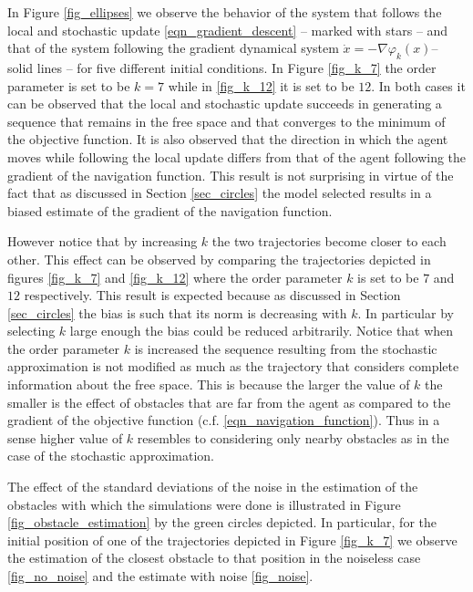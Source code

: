 \documentclass[article]{IEEEtran}
\theoremstyle{definition}
\begin{document}
In Figure \ref{fig_ellipses} we observe the behavior of the system that follows the local and stochastic update \eqref{eqn_gradient_descent} -- marked with stars -- and that of the system following the gradient dynamical system $\dot{x}=-\nabla \varphi_k(x)$-- solid lines -- for five different initial conditions. In Figure \ref{fig_k_7} the order parameter is set to be $k=7$ while in \ref{fig_k_12} it is set to be $12$. In both cases it can be observed that the local and stochastic update succeeds in generating a sequence that remains in the free space and that converges to the minimum of the objective function. It is also observed that the direction in which the agent moves while following the local update differs from that of the agent following the gradient of the navigation function. This result is not surprising in virtue of the fact that as discussed in Section \ref{sec_circles} the model selected results in a biased estimate of the gradient of the navigation function. 

However notice that by increasing $k$ the two trajectories become closer to each other. This effect can be observed by comparing the trajectories depicted in figures \ref{fig_k_7} and \ref{fig_k_12} where the order parameter $k$ is set to be $7$ and  $12$ respectively. This result is expected because as discussed in Section \ref{sec_circles} the bias is such that its norm is decreasing with $k$. In particular by selecting $k$ large enough the bias could be reduced arbitrarily. Notice that when the order parameter $k$ is increased the sequence resulting from the stochastic approximation is not modified as much as the trajectory that considers complete information about the free space. This is because the larger the value of $k$ the smaller is the effect of obstacles that are far from the agent as compared to the gradient of the objective function (c.f. \eqref{eqn_navigation_function}). Thus in a sense higher value of $k$ resembles to considering only nearby obstacles as in the case of the stochastic approximation. 

The effect of the standard deviations of the noise in the estimation of the obstacles with which the simulations were done is illustrated in Figure \ref{fig_obstacle_estimation} by the green circles depicted. In particular, for the initial position of one of the trajectories depicted in Figure \ref{fig_k_7} we observe the estimation of the closest obstacle to that position in the noiseless case \ref{fig_no_noise} and the estimate with noise \ref{fig_noise}.
%
%
\end{document}
